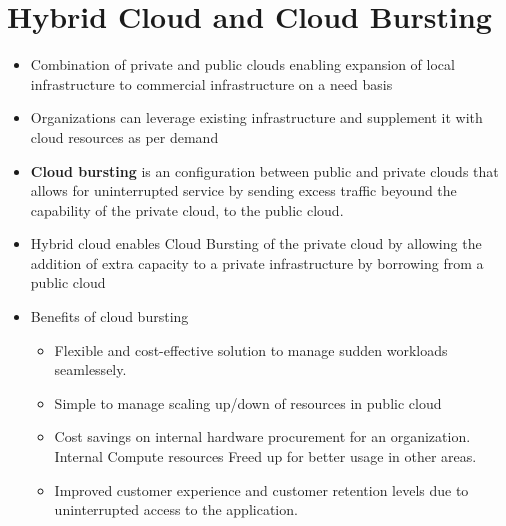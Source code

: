 \documentclass{article}
\begin{document}
\section{Hybrid Cloud and Cloud Bursting}
\begin{itemize}
    \item Combination of private and public clouds enabling expansion of local infrastructure to commercial infrastructure on a need basis
    
    \item Organizations can leverage existing infrastructure and supplement it with cloud resources as per demand
    
    \item \textbf{Cloud bursting} is an configuration between public and private clouds that allows for uninterrupted service by sending excess traffic beyound the capability of the private cloud, to the public cloud. 
    
    \item Hybrid cloud enables Cloud Bursting of the private cloud by allowing the addition of extra capacity to a private infrastructure by borrowing from a public cloud
    
    \item Benefits of cloud bursting
    \begin{itemize}
        \item Flexible and cost-effective solution to manage sudden workloads seamlessely.
        
        \item Simple to manage scaling up/down of resources in public cloud
        
        \item Cost savings on internal hardware procurement for an organization. Internal Compute resources Freed up for better usage in other areas.
        
        \item Improved customer experience and customer retention levels due to uninterrupted access to the application.
    \end{itemize}
\end{itemize}
\end{document}
